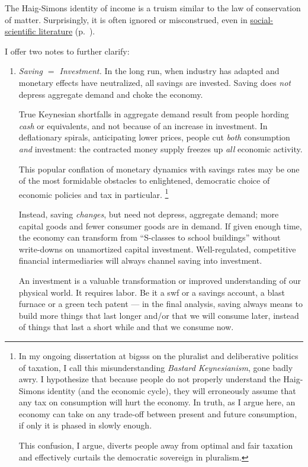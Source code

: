The Haig-Simons identity of income is a truism similar to the law of conservation of matter.
Surprisingly, it is often ignored or misconstrued, even in \hyperref[sec:Literature]{social-scientific literature} (p.~\pageref{sec:Literature}).

I offer two notes to further clarify:
\begin{enumerate}
	\item \emph{Saving $=$ Investment.}
	In the long run, when industry has adapted and monetary effects have neutralized, all savings are invested.
	Saving does \emph{not} depress aggregate demand and choke the economy.

	True Keynesian shortfalls in aggregate demand result from people hording \emph{cash} or equivalents, and not because of an increase in investment.
	In deflationary spirals, anticipating lower prices, people cut \emph{both} consumption \emph{and} investment:
	the contracted money supply freezes up \emph{all} economic activity.

	This popular conflation of monetary dynamics with savings rates may be one of the most formidable obstacles to enlightened, democratic choice of economic policies and tax in particular.
	\footnote{
		In my ongoing dissertation at \gls{bigsss} on the pluralist and deliberative politics of taxation, I call this misunderstanding \emph{Bastard Keynesianism}, gone badly awry.
		I hypothesize that because people do not properly understand the Haig-Simons identity (and the economic cycle), they will erroneously assume that any tax on consumption will hurt the economy.
		In truth, as I argue here, an economy can take on any trade-off between present and future consumption, if only it is phased in slowly enough.

		This confusion, I argue, diverts people away from optimal and fair taxation and effectively curtails the democratic sovereign in pluralism.
	}

	Instead, saving \emph{changes}, but need not depress, aggregate demand;
	more capital goods and fewer consumer goods are in demand.
	If given enough time, the economy can transform from ``S-classes to school buildings'' without write-downs on unamortized capital investment.
	Well-regulated, competitive financial intermediaries will always channel saving into investment.

	An investment is a valuable transformation or improved understanding of our physical world.
	It requires labor.
	Be it a \gls{swf} or a savings account, a blast furnace or a green tech patent --- in the final analysis, saving always means to build more things that last longer and/or that we will consume later, instead of things that last a short while and that we consume now.


\end{enumerate}
